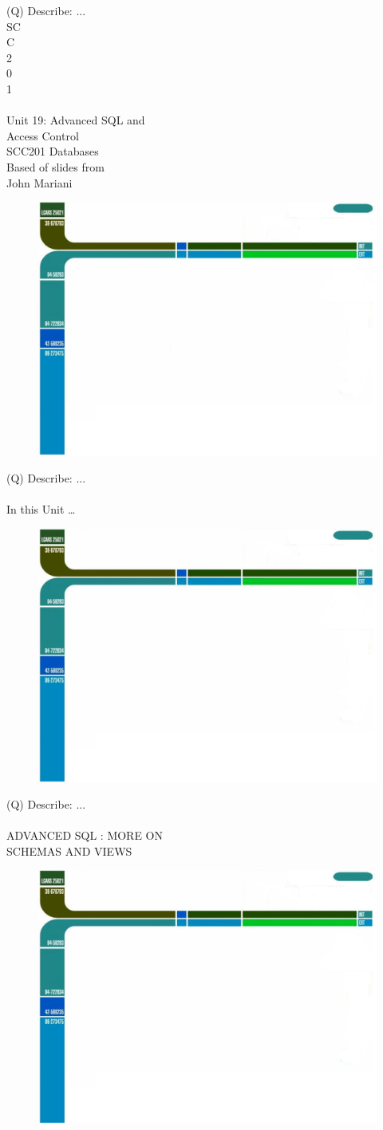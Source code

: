 \documentclass[12pt]{article}
\begin{document}
(Q)
Describe: ...
\\
SC\\
C\\
 2\\
0\\
1\\
 \\
Unit 19: Advanced SQL and \\
Access Control\\
SCC201 Databases\\
Based of slides from\\
John Mariani\\
\begin{figure}[H]
\includegraphics[width=0.5\linewidth]{page1-image-1.png}
\end{figure}
\clearpage
(Q)
Describe: ...
\\ 
 \\
In this Unit …\\
\begin{figure}[H]
\includegraphics[width=0.5\linewidth]{page2-image-1.png}
\end{figure}
\clearpage
(Q)
Describe: ...
\\ 
 \\
ADVANCED SQL : MORE ON \\
SCHEMAS AND VIEWS\\
\begin{figure}[H]
\includegraphics[width=0.5\linewidth]{page3-image-1.png}
\end{figure}
\end{document}
